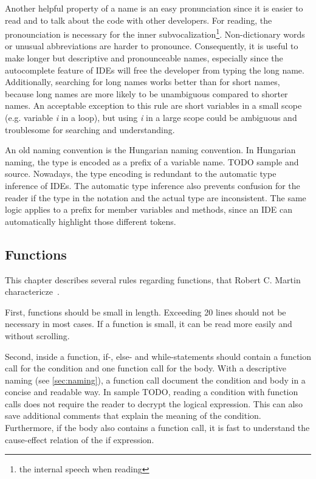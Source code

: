 Another helpful property of a name is an easy pronunciation since it is easier to read and to talk about the code with other developers. For reading, the pronounciation is necessary for the inner subvocalization\footnote{the internal speech when reading}. Non-dictionary words or unusual abbreviations are harder to pronounce. Consequently, it is useful to make longer but descriptive and pronounceable names, especially since the autocomplete feature of IDEs will free the developer from typing the long name. Additionally, searching for long names works better than for short names, because long names are more likely to be unambiguous compared to shorter names. An acceptable exception to this rule are short variables in a small scope (e.g. variable \textit{i} in a loop), but using \textit{i} in a large scope could be ambiguous and troublesome for searching and understanding.

An old naming convention is the Hungarian naming convention. In Hungarian naming, the type is encoded as a prefix of a variable name. TODO sample and source. Nowadays, the type encoding is redundant to the automatic type inference of IDEs. The automatic type inference also prevents confusion for the reader if the type in the notation and the actual type are inconsistent. The same logic applies to a prefix for member variables and methods, since an IDE can automatically highlight those different tokens.

\subsection{Functions}\label{sec:functions}
This chapter describes several rules regarding functions, that Robert C. Martin charactericze~\cite{martin_clean_2009}. 

First, functions should be small in length. Exceeding 20 lines should not be necessary in most cases. If a function is small, it can be read more easily and without scrolling. 

Second, inside a function, if-, else- and while-statements should contain a function call for the condition and one function call for the body. With a descriptive naming (see \ref{sec:naming}), a function call document the condition and body in a concise and readable way. In sample TODO, reading a condition with function calls does not require the reader to decrypt the logical expression. This can also save additional comments that explain the meaning of the condition. Furthermore, if the body also contains a function call, it is fast to understand the cause-effect relation of the if expression. 

